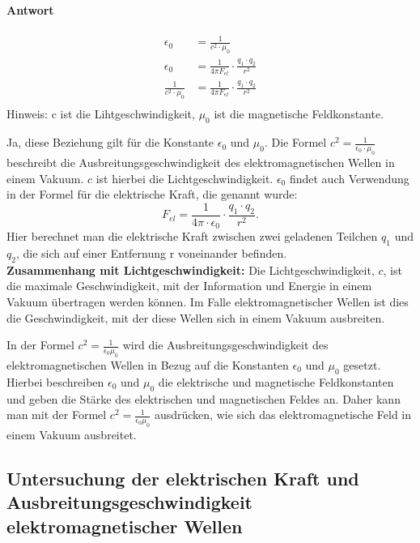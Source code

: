 \documentclass{report}
\begin{document}
\paragraph{Antwort}
\begin{align}
  \epsilon_0&=\frac{1}{c^2\cdot \mu_0}\\
  \epsilon_0&=\frac{1}{4\pi F_{el}}\cdot \frac{q_1\cdot q_2}{r^2}\\
  \frac{1}{c^2\cdot \mu_0}&=\frac{1}{4\pi F_{el}}\cdot \frac{q_1\cdot q_2}{r^2}\\
\end{align}
Hinweis: c ist die Lihtgeschwindigkeit, $\mu_0$ ist die magnetische Feldkonstante.

\noindent Ja, diese Beziehung gilt für die Konstante $\epsilon_0$  und $\mu_0$. 
Die Formel $c^2 = \frac{1}{\epsilon_0\cdot \mu_0}$ beschreibt die
Ausbreitungsgeschwindigkeit des elektromagnetischen Wellen in einem Vakuum. $c$
ist hierbei die Lichtgeschwindigkeit.
$\epsilon_0$ findet auch Verwendung in der Formel für die elektrische Kraft, die
genannt wurde: \[F_{el} = \frac{1}{4\pi \cdot \epsilon_0}\cdot \frac{q_1 \cdot  q_2}{r^2}.\] Hier berechnet
man die elektrische Kraft zwischen zwei geladenen Teilchen $q_1$ und $q_2$, die
sich auf einer Entfernung r voneinander befinden.\\

\noindent\textbf{Zusammenhang mit Lichtgeschwindigkeit:}
Die Lichtgeschwindigkeit, $c$, ist die maximale Geschwindigkeit, mit der
Information und Energie in einem Vakuum übertragen werden können. Im Falle
elektromagnetischer Wellen ist dies die Geschwindigkeit, mit der diese Wellen
sich in einem Vakuum ausbreiten.

\noindent In der Formel $c^2 = \frac{1}{\epsilon_0 \mu_0}$ wird die
Ausbreitungsgeschwindigkeit des elektromagnetischen Wellen in Bezug auf die
Konstanten $\epsilon_0$ und $\mu_0$ gesetzt. Hierbei beschreiben $\epsilon_0$
und $\mu_0$ die elektrische und magnetische Feldkonstanten und geben die Stärke
des elektrischen und magnetischen Feldes an. Daher kann man mit der Formel $c^2
= \frac{1}{\epsilon_0 \mu_0}$ ausdrücken, wie sich das elektromagnetische Feld
in einem Vakuum ausbreitet.
\clearpage
\subsection{Untersuchung der elektrischen Kraft und Ausbreitungsgeschwindigkeit elektromagnetischer Wellen}
\end{document}
